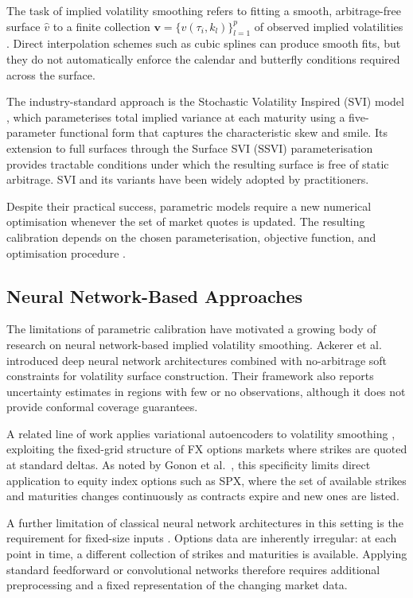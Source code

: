 The task of implied volatility smoothing refers to fitting a smooth, arbitrage-free surface $\hat{v}$ to a finite collection $\mathbf{v} = \{v(\tau_i, k_l)\}_{l=1}^{p}$ of observed implied volatilities \cite{gonon2024operator}. Direct interpolation schemes such as cubic splines can produce smooth fits, but they do not automatically enforce the calendar and butterfly conditions required across the surface.

The industry-standard approach is the Stochastic Volatility Inspired (SVI) model \cite{gatheral2014ssvi}, which parameterises total implied variance at each maturity using a five-parameter functional form that captures the characteristic skew and smile. Its extension to full surfaces through the Surface SVI (SSVI) parameterisation \cite{gatheral2014ssvi} provides tractable conditions under which the resulting surface is free of static arbitrage. SVI and its variants have been widely adopted by practitioners.

Despite their practical success, parametric models require a new numerical optimisation whenever the set of market quotes is updated. The resulting calibration depends on the chosen parameterisation, objective function, and optimisation procedure \cite{gonon2024operator}.

\subsection{Neural Network-Based Approaches}
\label{subsec:nn_smoothing}

The limitations of parametric calibration have motivated a growing body of research on neural network-based implied volatility smoothing. Ackerer et al.\ \cite{ackerer2020deep} introduced deep neural network architectures combined with no-arbitrage soft constraints for volatility surface construction. Their framework also reports uncertainty estimates in regions with few or no observations, although it does not provide conformal coverage guarantees.

A related line of work applies variational autoencoders to volatility smoothing \cite{bergeron2022variational}, exploiting the fixed-grid structure of FX options markets where strikes are quoted at standard deltas. As noted by Gonon et al.\ \cite{gonon2024operator}, this specificity limits direct application to equity index options such as SPX, where the set of available strikes and maturities changes continuously as contracts expire and new ones are listed.

A further limitation of classical neural network architectures in this setting is the requirement for fixed-size inputs \cite{gonon2024operator}. Options data are inherently irregular: at each point in time, a different collection of strikes and maturities is available. Applying standard feedforward or convolutional networks therefore requires additional preprocessing and a fixed representation of the changing market data.

